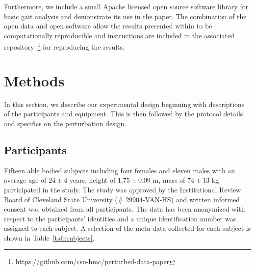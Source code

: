 \documentclass[fleqn,12pt]{wlpeerj}
\begin{document}
Furthermore, we include a small Apache licensed open source software library
for basic gait analysis and demonstrate its use in the paper. The combination
of the open data and open software allow the results presented within to be
computationally reproducible and instructions are included in the associated
repository~\footnote{https://github.com/csu-hmc/perturbed-data-paper} for
reproducing the results.

\section*{Methods}
%
In this section, we describe our experimental design beginning with
descriptions of the participants and equipment. This is then followed by the
protocol details and specifics on the perturbation design.

\subsection*{Participants}
%
Fifteen able bodied subjects including four females and eleven males with an
average age of $24\pm4$ years, height of $1.75\pm0.09$ m, mass of $74\pm13$ kg
participated in the study. The study was approved by the Institutional Review
Board of Cleveland State University (\# 29904-VAN-HS) and written informed
consent was obtained from all participants. The data has been anonymized with
respect to the participants' identities and a unique identification number was
assigned to each subject. A selection of the meta data collected for each
subject is shown in Table~\ref{tab:subjects}.
%
\begin{table}
  \cprotect\caption{Information about the 15 study participants in order of
    collection date. The subjects are divided into those that were used for the
    protocol pilot trials, i.e. the first three, and those used for the final
    protocol. The final three columns provide the trial numbers associated with
    each nominal treadmill speed. The measured mass is computed from the mean
    total vertical ground reaction force just after the calibration pose event,
    if possible.  If the mass is reported without an accompanying standard
    deviation, it is the subject's self-reported mass.  Additional trials found
    in the data set with a subject identification number 0 are trials with no
    subject, i.e.  unloaded trials that can be used for inertial compensation
    purposes, and are not shown in the table. Generated by
    \verb|src/subject_table.py|.}
  \centering
  \small
  
  \label{tab:subjects}
\end{table}
\end{document}
